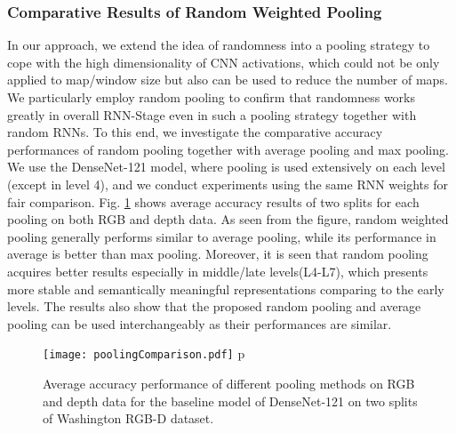 \subsubsection{Comparative Results of Random Weighted Pooling} \label{sec.exp.ma.poolingPerformances}
In our approach, we extend the idea of randomness into a pooling strategy to cope with the high dimensionality of CNN activations, which could not be only applied to map/window size but also can be used to reduce the number of maps. We particularly employ random pooling to confirm that randomness works greatly in overall RNN-Stage even in such a pooling strategy together with random RNNs. To this end, we investigate the comparative accuracy performances of random pooling together with average pooling and max pooling. We use the DenseNet-121 model, where pooling is used extensively on each level (except in level 4), and we conduct experiments using the same RNN weights for fair comparison. Fig. \ref{fig:poolingComparison} shows average accuracy results of two splits for each pooling on both RGB and depth data. As seen from the figure, random weighted pooling generally performs similar to average pooling, while its performance in average is better than max pooling. Moreover, it is seen that random pooling acquires better results especially in middle/late levels(L4-L7), which presents more stable and semantically meaningful representations comparing to the early levels. The results also show that the proposed random pooling and average pooling can be used interchangeably as their performances are similar.
\begin{figure}[!ht]
	\centering
	\texttt{[image: poolingComparison.pdf]}
p	\caption{Average accuracy performance of different pooling methods on RGB and depth data for the baseline model of DenseNet-121 on two splits of Washington RGB-D dataset.}
	\label{fig:poolingComparison}
\end{figure}

